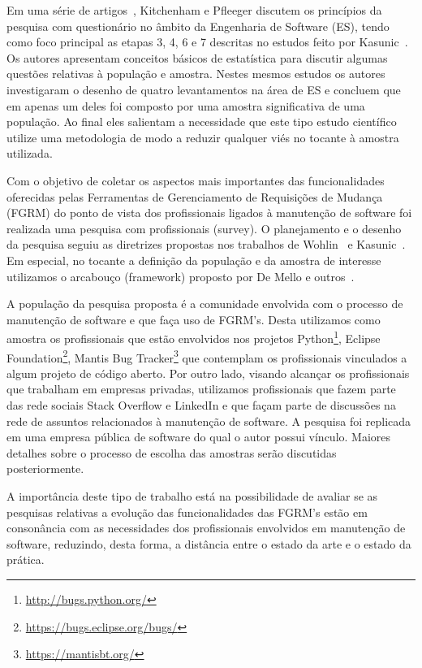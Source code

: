 Em uma série de artigos~\cite{pfleeger2001principles,pfleeger2002principles},
Kitchenham e Pfleeger discutem os princípios da pesquisa com questionário no
âmbito da Engenharia de Software (ES), tendo como foco principal as etapas 3, 4,
6 e 7 descritas no estudos feito por Kasunic~\cite{kasunic2005designing}. Os
autores apresentam conceitos básicos de estatística para discutir algumas
questões relativas à população e amostra. Nestes mesmos estudos os autores
investigaram o desenho de quatro levantamentos na área de ES e concluem que em
apenas um deles foi composto por uma amostra significativa de uma população. Ao
final eles salientam a necessidade que este tipo estudo científico utilize uma
metodologia de modo a reduzir qualquer viés no tocante à amostra utilizada.

Com o objetivo de coletar os aspectos mais importantes das funcionalidades
oferecidas pelas Ferramentas de Gerenciamento de Requisições de Mudança (FGRM)
do ponto de vista dos profissionais ligados à manutenção de software foi
realizada uma pesquisa com profissionais (survey). O planejamento e o desenho da
pesquisa seguiu as diretrizes propostas nos trabalhos de
Wohlin~\cite{wohlin2012experimentation} e Kasunic~\cite{kasunic2005designing}.
Em especial, no tocante a definição da população e da amostra de interesse
utilizamos o arcabouço (framework) proposto por De Mello e
outros~\cite{de2015investigating, de2014towards}.

A população da pesquisa proposta é a comunidade envolvida com o processo de
manutenção de software e que faça uso de FGRM's. Desta utilizamos  como amostra
os profissionais que estão envolvidos nos projetos
Python\footnote{\url{http://bugs.python.org/}}, Eclipse
Foundation\footnote{\url{https://bugs.eclipse.org/bugs/}}, Mantis Bug
Tracker\footnote{\url{https://mantisbt.org/}} que contemplam os profissionais
vinculados a algum projeto de código aberto. Por outro lado, visando alcançar os
profissionais que trabalham em empresas privadas, utilizamos profissionais que
fazem parte das rede sociais Stack Overflow e LinkedIn e que façam parte de
discussões na rede de assuntos relacionados à manutenção de software. A pesquisa
foi replicada em uma empresa pública de software do qual o autor possui vínculo.
Maiores detalhes sobre o processo de escolha das amostras serão discutidas
posteriormente.

A importância deste tipo de trabalho está na possibilidade de avaliar se as
pesquisas relativas a evolução das funcionalidades das FGRM's estão em
consonância com as necessidades dos profissionais envolvidos em manutenção de
software, reduzindo, desta forma, a distância entre o estado da arte e o estado
da prática.

